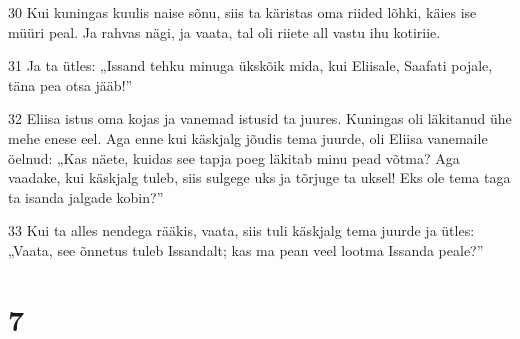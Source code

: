 \par 30 Kui kuningas kuulis naise sõnu, siis ta käristas oma riided lõhki, käies ise müüri peal. Ja rahvas nägi, ja vaata, tal oli riiete all vastu ihu kotiriie.
\par 31 Ja ta ütles: „Issand tehku minuga ükskõik mida, kui Eliisale, Saafati pojale, täna pea otsa jääb!”
\par 32 Eliisa istus oma kojas ja vanemad istusid ta juures. Kuningas oli läkitanud ühe mehe enese eel. Aga enne kui käskjalg jõudis tema juurde, oli Eliisa vanemaile öelnud: „Kas näete, kuidas see tapja poeg läkitab minu pead võtma? Aga vaadake, kui käskjalg tuleb, siis sulgege uks ja tõrjuge ta uksel! Eks ole tema taga ta isanda jalgade kobin?”
\par 33 Kui ta alles nendega rääkis, vaata, siis tuli käskjalg tema juurde ja ütles: „Vaata, see õnnetus tuleb Issandalt; kas ma pean veel lootma Issanda peale?”

\chapter{7}

